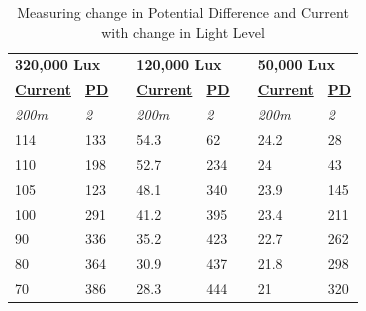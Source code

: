 \documentclass{article}
\begin{document}
\begin{table}[!ht]
\centering
\caption{Measuring change in Potential Difference and Current with change in Light Level}
\label{my-label}
\begin{tabular}{|l|l|l|l|l|l|l|l|}
\cline{1-2} \cline{4-5} \cline{7-8}
\multicolumn{2}{|l|}{\textbf{320,000 Lux}} & {\ul }          & \multicolumn{2}{l|}{\textbf{120,000 Lux}}  & {\ul }          & \multicolumn{2}{l|}{\textbf{50,000 Lux}}   \\ \cline{1-2} \cline{4-5} \cline{7-8}
{\ul \textbf{Current}} & {\ul \textbf{PD}} & {\ul \textbf{}} & {\ul \textbf{Current}} & {\ul \textbf{PD}} & {\ul \textbf{}} & {\ul \textbf{Current}} & {\ul \textbf{PD}} \\ \cline{1-2} \cline{4-5} \cline{7-8}
\textit{200m}          & \textit{2}        & \textit{}       & \textit{200m}          & \textit{2}        & \textit{}       & \textit{200m}          & \textit{2}        \\ \cline{1-2} \cline{4-5} \cline{7-8}
114                    & 133               &                 & 54.3                   & 62                &                 & 24.2                   & 28                \\ \cline{1-2} \cline{4-5} \cline{7-8}
110                    & 198               &                 & 52.7                   & 234               &                 & 24                     & 43                \\ \cline{1-2} \cline{4-5} \cline{7-8}
105                    & 123               &                 & 48.1                   & 340               &                 & 23.9                   & 145               \\ \cline{1-2} \cline{4-5} \cline{7-8}
100                    & 291               &                 & 41.2                   & 395               &                 & 23.4                   & 211               \\ \cline{1-2} \cline{4-5} \cline{7-8}
90                     & 336               &                 & 35.2                   & 423               &                 & 22.7                   & 262               \\ \cline{1-2} \cline{4-5} \cline{7-8}
80                     & 364               &                 & 30.9                   & 437               &                 & 21.8                   & 298               \\ \cline{1-2} \cline{4-5} \cline{7-8}
70                     & 386               &                 & 28.3                   & 444               &                 & 21                     & 320               \\ \cline{1-2} \cline{4-5} \cline{7-8}

\end{tabular}
\end{table}
\end{document}

